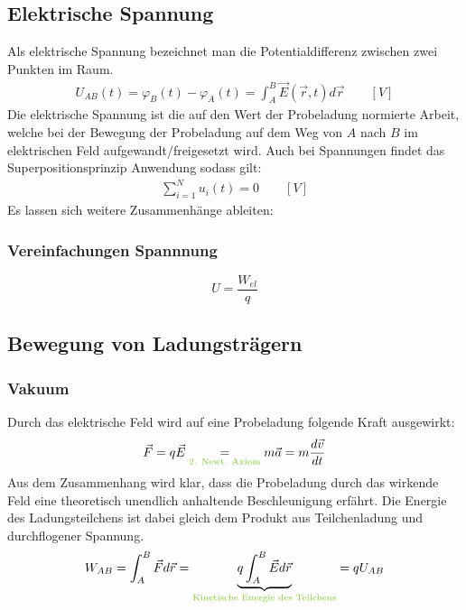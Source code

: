 \documentclass[12pt,a4paper]{article}%
\numberwithin{equation}{section}
\def\colGreen#1{\begingroup\color{LimeGreen}{#1}\endgroup}
\def\usGreen#1#2{\underset{\colGreen{#1}}{#2}}
\begin{document}
\subsection{Elektrische Spannung}
Als elektrische Spannung bezeichnet man die Potentialdifferenz zwischen zwei Punkten im Raum.
\begin{align}
U_{AB}(t) = \varphi_B (t) - \varphi_A (t) = \int_A^B \vec{E}(\vec{r},t)d\vec{r} \qquad \left[V\right] \label{eq:voltage_1_volt}
\end{align}
Die elektrische Spannung ist die auf den Wert der Probeladung normierte Arbeit, welche bei der Bewegung der Probeladung auf dem Weg von $A$ nach $B$ im elektrischen Feld aufgewandt/freigesetzt wird. \cite{GDE12}
\newline
Auch bei Spannungen findet das Superpositionsprinzip Anwendung sodass gilt:
\begin{align}
\sum_{i=1}^N u_i (t) = 0 \qquad \left[V\right] \label{eq:voltage_2_sum}
\end{align}
Es lassen sich weitere Zusammenhänge ableiten:

\subsubsection{Vereinfachungen Spannnung}
\begin{equation}
U = \frac{W_{el}}{q}
\end{equation}

\subsection{Bewegung von Ladungsträgern}
\subsubsection{Vakuum}
Durch das elektrische Feld wird auf eine Probeladung folgende Kraft ausgewirkt:
\begin{align}
\vec{F} = q\vec{E} \usGreen{\text{2. Newt. Axiom}}{=} m\vec{a} = m \frac{d\vec{v}}{dt} \label{eq:bew_1_vak}
\end{align}
Aus dem Zusammenhang wird klar, dass die Probeladung durch das wirkende Feld eine theoretisch unendlich anhaltende Beschleunigung erfährt. Die Energie des Ladungsteilchens ist dabei gleich dem Produkt aus Teilchenladung und durchflogener Spannung.
\begin{align}
W_{AB} = \int_A^B \vec{F}d\vec{r} = \underbrace{q \int_A^B \vec{E}d\vec{r}}_{\colGreen{\text{Kinetische Energie des Teilchens}}} = q U_{AB} \label{eq:bew_2_mat}
\end{align}
\end{document}
